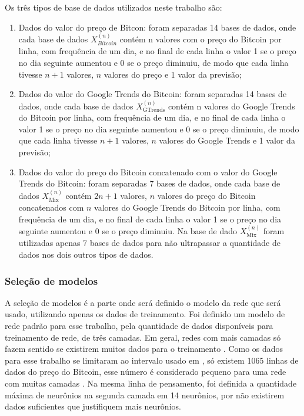 Os três tipos de base de dados utilizados neste trabalho são:
\begin{enumerate}

    \item Dados do valor do preço de Bitcon: foram separadas 14 bases de dados, onde cada base de dados $X_{Bitcoin}^{(n)}$ contém n valores com o preço do Bitcoin por linha, com frequência de um dia, e no final de cada linha o valor 1 se o preço no dia seguinte aumentou e 0 se o preço diminuiu, de modo que cada linha tivesse $n+1$ valores, $n$ valores do preço e 1 valor da previsão;
    
    \item Dados do valor do Google Trends do Bitcoin: foram separadas 14 bases de dados, onde cada base de dados $X_{\text{GTrends}}^{(n)}$ contém n valores do Google Trends do Bitcoin por linha, com frequência de um dia, e no final de cada linha o valor 1 se o preço no dia seguinte aumentou e 0 se o preço diminuiu, de modo que cada linha tivesse $n+1$ valores, $n$ valores do Google Trends e 1 valor da previsão;
    
    \item Dados do valor do preço do Bitcoin concatenado com o valor do Google Trends do Bitcoin: foram separadas 7 bases de dados, onde cada base de dados $X_{\text{Mix}}^{(n)}$ contém $2n+1$ valores, $n$ valores do preço do Bitcoin concatenados com $n$ valores do Google Trends do Bitcoin por linha, com frequência de um dia, e no final de cada linha o valor 1 se o preço no dia seguinte aumentou e 0 se o preço diminuiu. Na base de dado $X_{\text{Mix}}^{(n)}$ foram utilizadas apenas 7 bases de dados para não ultrapassar a quantidade de dados nos dois outros tipos de dados.
    
\end{enumerate}

\subsubsection{Seleção de modelos}
\label{sec:meto0}

 A seleção de modelos é a parte onde será definido o modelo da rede que será usado, utilizando apenas os dados de treinamento. Foi definido um modelo de rede padrão para esse trabalho, pela quantidade de dados disponíveis para treinamento de rede, de três camadas. Em geral, redes com mais camadas só fazem sentido se existirem muitos dados para o treinamento . Como os dados para esse trabalho se limitaram ao intervalo usado em \cite{mcnally2016predicting}, só existem 1065 linhas de dados do preço do Bitcoin, esse número é considerado pequeno para uma rede com muitas camadas . Na mesma linha de pensamento, foi definida a quantidade máxima de neurônios na segunda camada em 14 neurônios, por não existirem dados suficientes que justifiquem mais neurônios.
 
